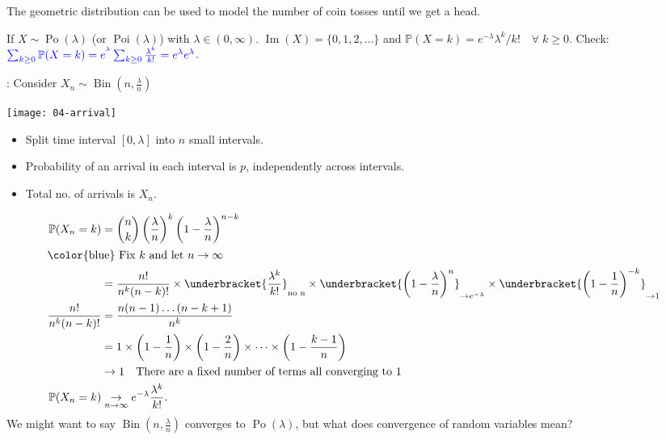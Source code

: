 The geometric distribution can be used to model the number of coin tosses until we get a head.

\begin{definition}
    If $X \sim \operatorname{Po}(\lambda)$ (or $\operatorname{Poi}(\lambda)$) with $\lambda \in (0, \infty)$.
    $\operatorname{Im}(X) = \{0, 1, 2, \dots\}$ and $\mathbb{P}(X = k) = e^{- \lambda} \lambda^k / k! \quad \forall \; k \geq 0$.
    \color{blue} Check: $\mathcolor{blue}{\sum_{k \geq 0} \mathbb{P}(X = k) = e^{^\lambda} \sum_{k \geq 0} \frac{\lambda^k}{k!} = e^{\lambda} e^\lambda}$.\color{black}
\end{definition} 

: Consider $X_n \sim \operatorname{Bin}(n, \frac{\lambda}{n})$
    \begin{example}
    {\par \centering \texttt{[image: 04-arrival]} \par}
    \begin{itemize}
        \item Split time interval $[0, \lambda]$ into $n$ small intervals.
        \item Probability of an arrival in each interval is $p$, independently across intervals.
        \item Total no. of arrivals is $X_n$.
    \end{itemize} 

    \begin{align*}
        \mathbb{P}(X_n = k) &= \binom{n}{k} \left(\frac{\lambda}{n}\right)^k \left(1 - \frac{\lambda}{n}\right)^{n - k} \\
        \intertext{\color{blue} Fix $k$ and let $n \to \infty$}
        &= \frac{n!}{n^k (n - k)!} \times \underbracket{\frac{\lambda^k}{k!}}_{\text{no n}} \times \underbracket{\left(1 - \frac{\lambda}{n}\right)^n}_{\to e^{-\lambda}} \times \underbracket{\left(1 - \frac{1}{n}\right)^{-k}}_{\to 1} \\
        \frac{n!}{n^k (n - k)!} &= \frac{n (n-1) \dots (n - k + 1)}{n^k} \\
        &= 1 \times \left(1 - \frac{1}{n}\right) \times \left(1 - \frac{2}{n}\right) \times \dots \times \left(1 - \frac{k - 1}{n}\right) \\
        &\to 1 \quad \text{There are a fixed number of terms all converging to 1} \\
        \mathbb{P}(X_n = k) &\underset{n \to \infty}{\to} e^{-\lambda} \frac{\lambda^k}{k!}.
    \end{align*} 
    \color{blue} We might want to say $\operatorname{Bin}(n, \frac{\lambda}{n})$ converges to $\operatorname{Po}(\lambda)$, but what does convergence of random variables mean?
\end{example}

